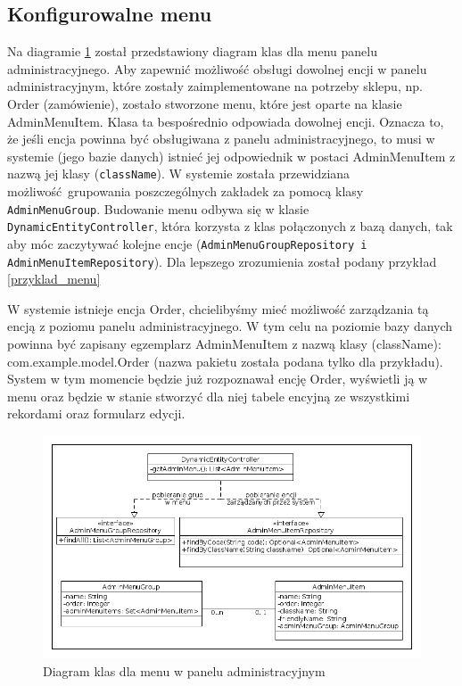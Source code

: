 \subsection{Konfigurowalne menu}
Na diagramie \ref{klasy_menu} został przedstawiony diagram klas dla menu panelu administracyjnego. Aby zapewnić możliwość obsługi dowolnej encji w panelu administracyjnym, które zostały zaimplementowane na potrzeby sklepu, np. Order (zamówienie), zostało stworzone menu, które jest oparte na klasie AdminMenuItem. Klasa ta bespośrednio odpowiada dowolnej encji. Oznacza to, że jeśli encja powinna być obsługiwana z panelu administracyjnego, to musi w systemie (jego bazie danych) istnieć jej odpowiednik w postaci AdminMenuItem z nazwą jej klasy (\texttt{className}). W systemie została przewidziana możliwość grupowania poszczególnych zakładek za pomocą klasy \texttt{AdminMenuGroup}. Budowanie menu odbywa się w klasie \texttt{DynamicEntityController}, która korzysta z klas połączonych z bazą danych, tak aby móc zaczytywać kolejne encje (\texttt{AdminMenuGroupRepository i AdminMenuItemRepository}). Dla lepszego zrozumienia został podany przykład \ref{przyklad_menu}
\begin{example}
	W systemie istnieje encja Order, chcielibyśmy mieć możliwość zarządzania tą encją z poziomu panelu administracyjnego. W tym celu na poziomie bazy danych powinna być zapisany egzemplarz AdminMenuItem z nazwą klasy (className): com.example.model.Order (nazwa pakietu została podana tylko dla przykładu). System w tym momencie będzie już rozpoznawał encję Order, wyświetli ją w menu oraz będzie w stanie stworzyć dla niej tabele encyjną ze wszystkimi rekordami oraz formularz edycji. 
\end{example} 
\begin{figure}
	\begin{center}
		\includegraphics[scale=0.5]{klasy_menu.png}
	\end{center}
	\caption{{\color{black}Diagram klas dla menu w panelu administracyjnym}} \label{klasy_menu}
\end{figure}

